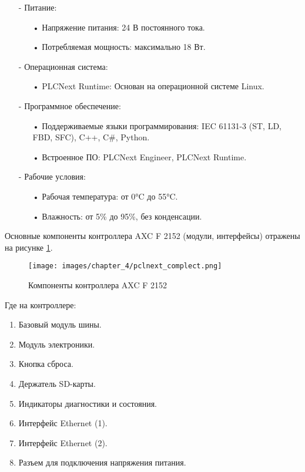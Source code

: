 \begin{itemize}
    \item[-] Питание:
        \begin{itemize}
            \item[•] Напряжение питания: 24 В постоянного тока.
            \item[•] Потребляемая мощность: максимально 18 Вт.
        \end{itemize}

    \item[-] Операционная система:
        \begin{itemize}
            \item[•] PLCNext Runtime: Основан на операционной системе Linux.
        \end{itemize}

    \item[-] Программное обеспечение:
        \begin{itemize}
            \item[•] Поддерживаемые языки программирования: IEC 61131-3 (ST, LD, FBD, SFC), C++, C\#, Python.
            \item[•] Встроенное ПО: PLCNext Engineer, PLCNext Runtime.
        \end{itemize}

    \item[-] Рабочие условия:
        \begin{itemize}
            \item[•] Рабочая температура: от 0°C до 55°C.
            \item[•] Влажность: от 5\% до 95\%, без конденсации.
        \end{itemize}

\end{itemize}

Основные компоненты контроллера AXC F 2152 (модули, интерфейсы) отражены на рисунке \ref{fig:PLCComplect}. 

\begin{figure}[H]
    \centering
    \texttt{[image: images/chapter\_4/pclnext\_complect.png]}
    \caption{Компоненты контроллера AXC F 2152}
    \label{fig:PLCComplect}
\end{figure}

Где на контроллере:

\begin{enumerate}
    \item Базовый модуль шины.
    \item Модуль электроники.
    \item Кнопка сброса.
    \item Держатель SD-карты.
    \item Индикаторы диагностики и состояния.
    \item Интерфейс Ethernet (1).
    \item Интерфейс Ethernet (2).
    \item Разъем для подключения напряжения питания.
\end{enumerate}

